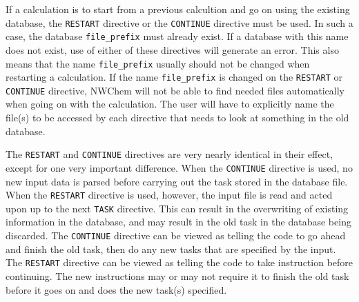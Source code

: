 If a calculation is to start from a previous calcultion and go on
using the existing database, the \verb+RESTART+ directive or the
\verb+CONTINUE+ directive must be used.  In such a case, the database
\verb+file_prefix+ must already exist.  If a database with this name 
does not exist, use of either of these directives will generate an error.
This also means that the name {\tt file\_prefix} usually should not be 
changed when restarting a calculation.  If the name {\tt file\_prefix} is 
changed on the \verb+RESTART+ or \verb+CONTINUE+ directive, 
NWChem will not be able to
find needed files automatically when going on with the calculation.
The user will have to explicitly name the file(s) to be accessed by each
directive that needs to look at something in the old database.

The \verb+RESTART+ and \verb+CONTINUE+ directives are very nearly identical
in their effect, except for one very important difference.  When the
\verb+CONTINUE+ directive is used, no new input data is parsed before
carrying out the task stored in the database file.  When the \verb+RESTART+
directive is used, however, the input file is read and acted upon up to
the next \verb+TASK+ directive.  This can result in the overwriting of
existing information in the database, and may result in the old task in
the database being discarded.
% 
The \verb+CONTINUE+ directive can be viewed as telling the code to
go ahead and finish the old task, then do any new tasks that are
specified by the input. The \verb+RESTART+ directive can 
be viewed as telling the code to take instruction before continuing.  The
new instructions may or may not require it to finish the old task before 
it goes on and does the new task(s) specified.

